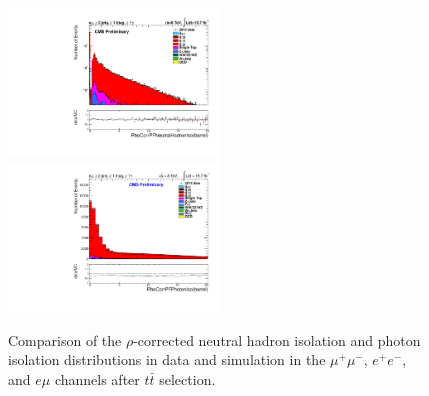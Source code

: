 \documentclass[oneside, a4paper, 11pt, ]{report}
\begin{document}
\begin{figure}
\includegraphics[width=0.5\textwidth]{Plots/ControlPlots/TTbarDiLeptonAnalysis/EMu/Photons/AllPhotons/Log/Photon_RhoCorrectedPFNeutralHadronIso_barrel_splitTTbar_ratio.pdf}
\includegraphics[width=0.5\textwidth]{Plots/ControlPlots/TTbarDiLeptonAnalysis/EMu/Photons/AllPhotons/Photon_RhoCorrectedPFPhotonIso_barrel_splitTTbar_ratio.pdf}
\caption{Comparison of the $\rho$-corrected neutral hadron isolation and photon isolation distributions in data and simulation in the $\mu^{+}\mu^{-}$, $e^{+}e^{-}$, and $e\mu$ channels after $t\bar{t}$ selection.}
\label{fig-ttbarNeutralHadronAndPhotonIso}
\end{figure}
\end{document}
